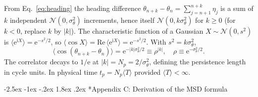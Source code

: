 \documentclass[11pt,a4paper]{article}
\makeatletter
\renewcommand\section{\@startsection{section}{1}{\z@}%
  {-2.5ex \@plus -1ex \@minus -.2ex}%
  {1.8ex \@plus.2ex}%
  {\normalfont\normalsize\bfseries\centering}}
\makeatother
\begin{document}
From Eq.~\eqref{eq:heading} the heading difference
$\theta_{n+k} - \theta_n = \sum_{j=n+1}^{n+k} \eta_j$ is a sum of
$k$ independent $\mathcal{N}(0, \sigma_\theta^2)$ increments, hence
itself $\mathcal{N}(0, k\sigma_\theta^2)$ for $k \ge 0$
(for $k<0$, replace $k$ by $|k|$). The characteristic function of
a Gaussian $X \sim \mathcal{N}(0, s^2)$ is $\langle \mathrm{e}^{\mathrm{i}X}\rangle
= \mathrm{e}^{-s^2/2}$, so
$\langle \cos X\rangle = \mathrm{Re}\,\langle \mathrm{e}^{\mathrm{i}X}\rangle
= \mathrm{e}^{-s^2/2}$. With $s^2 = k\sigma_\theta^2$,
\begin{equation}
\langle \cos(\theta_{n+k} - \theta_n)\rangle
 = \mathrm{e}^{-|k|\sigma_\theta^2/2}
 \equiv \rho^{|k|},
\quad \rho \equiv \mathrm{e}^{-\sigma_\theta^2/2}.
\label{eq:app-correlator}
\end{equation}
The correlator decays to $1/\mathrm{e}$ at $|k| = N_p =
2/\sigma_\theta^2$, defining the persistence length in cycle
units. In physical time $t_p = N_p \langle T\rangle$ provided
$\langle T\rangle < \infty$.

\section*{Appendix C: Derivation of the MSD formula}
\label{app:derivation}
\end{document}
